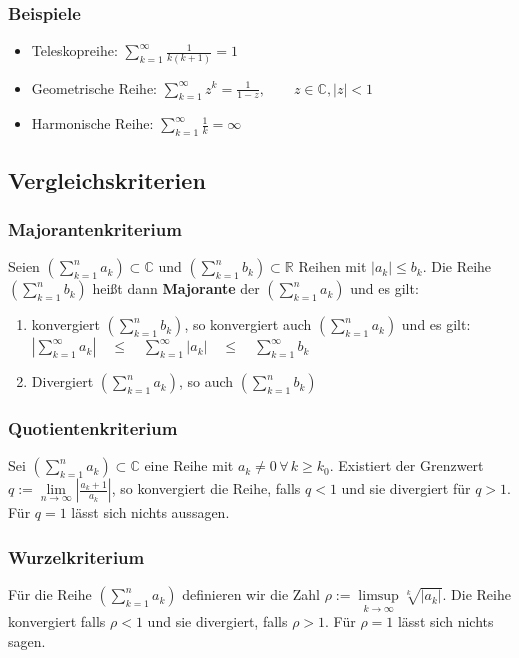 \documentclass[10pt,a4paper^, twocolumn]{article}
\newcommand{\R}{\mathbb{R}}
\newcommand{\C}{\mathbb{C}}
\begin{document}
		\subsubsection{Beispiele}
			\begin{itemize}
				\item Teleskopreihe: $ \sum\limits_{k=1}^{\infty} \frac{1}{k(k+1)}  = 1$
				\item Geometrische Reihe: $ \sum\limits_{k=1}^{\infty} z^k = \frac{1}{1-z},
				\qquad z \in \C, |z| < 1 $
				\item Harmonische Reihe: $\sum\limits_{k=1}^{\infty} \frac{1}{k} = \infty $
			\end{itemize}
	\subsection{Vergleichskriterien}
		\subsubsection{Majorantenkriterium}
			Seien $\left( \sum\limits_{k=1}^{n} a_k \right) \subset \C$ 
			und $\left( \sum\limits_{k=1}^{n} b_k \right) \subset \R$ Reihen mit 
			$|a_k| \leq b_k$. Die Reihe $\left( \sum\limits_{k=1}^{n} b_k \right)$
			heißt dann \textbf{Majorante} der $\left( \sum\limits_{k=1}^{n} a_k \right)$ 
			und es gilt:
			\begin{enumerate}
				\item konvergiert $\left( \sum\limits_{k=1}^{n} b_k \right)$,
					so konvergiert auch $\left( \sum\limits_{k=1}^{n} a_k \right)$ und es
					gilt: $\left| \sum\limits_{k=1}^{\infty} a_k \right|
					\quad \leq \quad \sum\limits_{k=1}^{\infty} |a_k| 
					\quad \leq \quad \sum\limits_{k=1}^{\infty} b_k$
				\item Divergiert $\left( \sum\limits_{k=1}^{n} a_k \right)$, so auch
					$\left( \sum\limits_{k=1}^{n} b_k \right)$ 
			\end{enumerate}
		\subsubsection{Quotientenkriterium}
			Sei $\left( \sum\limits_{k=1}^{n} a_k \right) \subset \C$ eine Reihe mit 
			$a_k \neq 0 \, \forall \, k \geq k_0$. Existiert der Grenzwert 
			$q := \lim\limits_{n \to \infty} \left| \frac{a_k+1}{a_k} \right|$, so 
			konvergiert die Reihe, falls $q < 1$ und sie divergiert für $q > 1$. Für $q=1$
			lässt sich nichts aussagen.
		\subsubsection{Wurzelkriterium}
			Für die Reihe $\left( \sum\limits_{k=1}^{n} a_k \right)$ definieren wir die Zahl
			$\rho := \limsup\limits_{k \to \infty} \sqrt[k]{|a_k|} $. Die Reihe konvergiert
			falls $\rho < 1$ und sie divergiert, falls $\rho > 1$. Für $\rho = 1$ lässt sich 
			nichts sagen.
\end{document}
